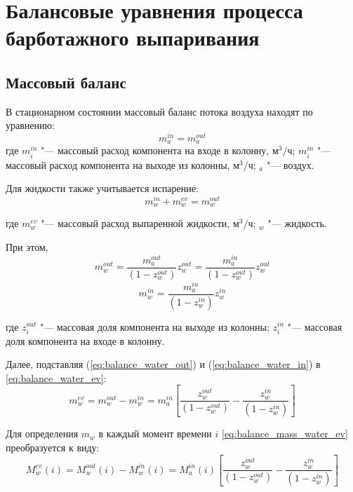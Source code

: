 \section{Балансовые уравнения процесса барботажного выпаривания}

\subsection{Массовый баланс}

В стационарном состоянии массовый баланс потока воздуха находят по уравнению:
\begin{equation}
{m}_{a}^{in}={m}_{a}^{out}
\end{equation}
где \({m}_{i}^{in}\) "--- массовый расход компонента на входе в колонну, \(м^{3}/ч\);
\({m}_{i}^{in}\) "--- массовый расход компонента на выходе из колонны, \(м^{3}/ч\);
\({}_{a}\) "--- воздух.


Для жидкости также учитывается  испарение:
\begin{equation}
{m}_{w}^{in}+{m}_{w}^{ev}={m}_{w}^{out}\label{eq:balance_water_ev}
\end{equation}

где \({m}_{w}^{ev}\) "--- массовый расход выпаренной жидкости, \(м^{3}/ч\);
\({}_{w}\) "--- жидкость.


При этом,
\begin{equation}
{m}_{w}^{out}=\frac{{m}_{a}^{out}}{\left(1-{z}_{w}^{out}\right)}{z}_{w}^{out}= \frac{{m}_{a}^{in}}{\left(1-{z}_{w}^{out}\right)}{z}_{w}^{out}\label{eq:balance_water_out}
\end{equation}
\begin{equation}
{m}_{w}^{in}=\frac{{m}_{a}^{in}}{\left(1-{z}_{w}^{in}\right)}{z}_{w}^{in}\label{eq:balance_water_in} 
\end{equation}

где \({z}_{i}^{out}\) "--- массовая доля компонента на выходе из колонны;
\({z}_{i}^{in}\) "--- массовая доля компонента на входе в колонну.


Далее, подставляя (\ref{eq:balance_water_out}) и (\ref{eq:balance_water_in}) в \cref{eq:balance_water_ev}:  
\begin{equation}
{m}_{w}^{ev}={m}_{w}^{out}-{m}_{w}^{in}= {m}_{a}^{in}\left[\frac{{z}_{w}^{out}}{\left(1-{z}_{w}^{out}\right)}-\frac{{z}_{w}^{in}}{\left(1-{z}_{w}^{in}\right)}\right]\label{eq:balance_mass_water_ev} \end{equation}

Для определения \({m}_{w}\) в каждый момент времени \(i\)  \cref{eq:balance_mass_water_ev} преобразуется к виду:
\begin{equation}
{M}_{w}^{ev}(i)={M}_{w}^{out}(i)-{M}_{w}^{in}(i)= {M}_{a}^{in}(i)\left[\frac{{z}_{w}^{out}}{\left(1-{z}_{w}^{out}\right)}-\frac{{z}_{w}^{in}}{\left(1-{z}_{w}^{in}\right)}\right]\label{eq:balance_water_ev_i} \end{equation}

